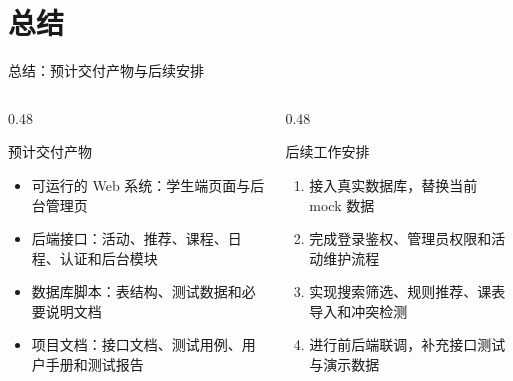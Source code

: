 \documentclass[UTF8,aspectratio=169]{ctexbeamer}
\begin{document}
\section{总结}
\begin{frame}{总结：预计交付产物与后续安排}
    \small
    \begin{columns}[T,onlytextwidth]
        \begin{column}{0.48\textwidth}
            \begin{block}{预计交付产物}
                \begin{itemize}
                    \item 可运行的 Web 系统：学生端页面与后台管理页
                    \item 后端接口：活动、推荐、课程、日程、认证和后台模块
                    \item 数据库脚本：表结构、测试数据和必要说明文档
                    \item 项目文档：接口文档、测试用例、用户手册和测试报告
                \end{itemize}
            \end{block}
        \end{column}
        \begin{column}{0.48\textwidth}
            \begin{block}{后续工作安排}
                \begin{enumerate}
                    \item 接入真实数据库，替换当前 mock 数据
                    \item 完成登录鉴权、管理员权限和活动维护流程
                    \item 实现搜索筛选、规则推荐、课表导入和冲突检测
                    \item 进行前后端联调，补充接口测试与演示数据
                \end{enumerate}
            \end{block}
        \end{column}
    \end{columns}
\end{frame}
\end{document}
